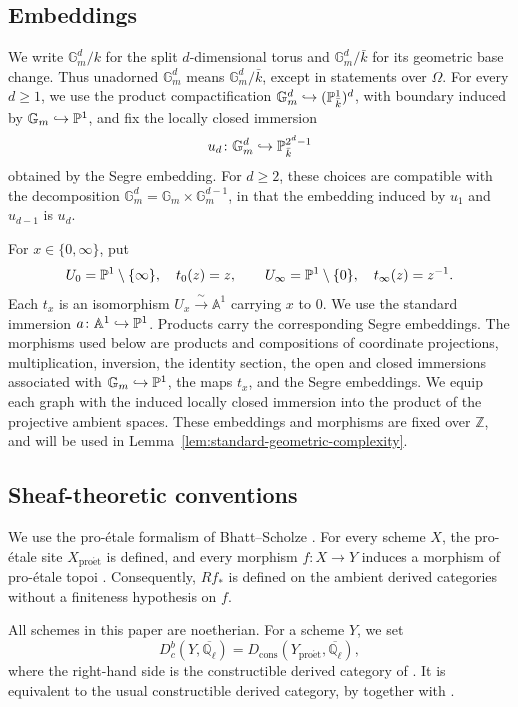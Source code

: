 \documentclass[12pt,reqno]{amsart}
\theoremstyle{definition}
\theoremstyle{plain}
\theoremstyle{definition}
\theoremstyle{remark}
\newcommand{\bbA}{\mathbb{A}}  \newcommand{\bbB}{\mathbb{B}}
\newcommand{\bbG}{\mathbb{G}}  \newcommand{\bbH}{\mathbb{H}}
\newcommand{\bbQ}{\mathbb{Q}}  \newcommand{\bbR}{\mathbb{R}}
\newcommand{\ol}[1]{\overline{#1}}
\newcommand{\Ql}{\bbQ_{\ell}}
\newcommand{\Db}{D^b_c}
\newcommand{\Gm}{\bbG_m}
\begin{document}
\subsection{Embeddings}
\label{sec:embeddings}

We write \(\Gm^d/k\) for the split \(d\)-dimensional torus and \(\Gm^d/\bar k\) for its geometric base
change.  Thus unadorned \(\Gm^d\) means \(\Gm^d/\bar k\), except in statements over \(\Omega\).
For every \(d\ge1\), we use the product compactification
\(\Gm^d\hookrightarrow(\bbP^1_{\bar k})^d\), with boundary induced by
\(\Gm\hookrightarrow\bbP^1\), and fix the locally closed immersion
\[
        u_d\colon \Gm^d\hookrightarrow\bbP^{2^d-1}_{\bar k}
\]
obtained by the Segre embedding.  For \(d\ge2\), these choices are compatible with the decomposition
\(\Gm^d=\Gm\times\Gm^{d-1}\), in that the embedding induced by \(u_1\) and \(u_{d-1}\) is \(u_d\).

For \(x\in\{0,\infty\}\), put
\[
 U_0=\mathbb{P}^1\setminus\{\infty\},\quad t_0(z)=z,
 \qquad
 U_\infty=\mathbb{P}^1\setminus\{0\},\quad t_\infty(z)=z^{-1}.
\]
Each \(t_x\) is an isomorphism \(U_x\xrightarrow{\ \sim\ }\bbA^1\) carrying \(x\) to \(0\).
We use the standard immersion \(a\colon\bbA^1\hookrightarrow\bbP^1\).  Products carry the corresponding
Segre embeddings.  The morphisms used below are products and compositions of coordinate projections,
multiplication, inversion, the identity section, the open and closed immersions associated with
\(\Gm\hookrightarrow\bbP^1\), the maps \(t_x\), and the Segre embeddings.  We equip each graph
with the induced locally closed immersion into the product of the projective ambient spaces.  These
embeddings and morphisms are fixed over \(\mathbb Z\), and will be used in 
Lemma~\ref{lem:standard-geometric-complexity}.

\subsection{Sheaf-theoretic conventions}
\label{sec:sheaves}

We use the pro-\'etale formalism of Bhatt--Scholze \cite{BhattScholze2015}.  For every scheme \(X\),
the pro-\'etale site \(X_{\mathrm{pro\acute et}}\) is defined, and every morphism
\(f\colon X\to Y\) induces a morphism of pro-\'etale topoi
\cite[Def.~4.1.1, Lem.~5.4.1]{BhattScholze2015}.  Consequently, \(Rf_*\) is defined on the ambient
derived categories without a finiteness hypothesis on \(f\).

All schemes in this paper are noetherian.  For a scheme \(Y\), we set
\[
        \Db(Y,\ol\Ql)=D_{\mathrm{cons}}(Y_{\mathrm{pro\acute et}},\ol\Ql),
\]
where the right-hand side is the constructible derived category of
\cite[Defs.~6.8.6, 6.8.8]{BhattScholze2015}.  It is equivalent to the usual constructible derived
category, by \cite[Prop.~6.8.14]{BhattScholze2015} together with
\cite[Def.~6.5.1, Prop.~6.6.11]{BhattScholze2015}.
\end{document}
